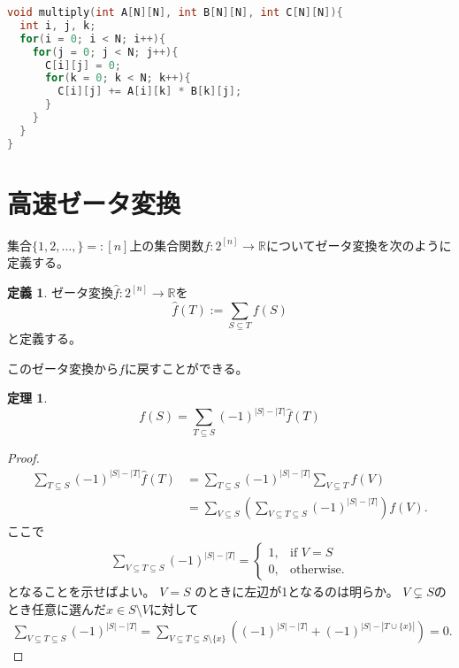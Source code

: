 \documentclass[a4paper,twoside,onecolumn,openany,article,10pt]{memoir}
\newtheorem{theorem}{定理}
\theoremstyle{definition}
\newtheorem{definition}{定義}
\theoremstyle{remark}
\begin{document}
\begin{lstlisting}[basicstyle=\ttfamily\normalsize,showstringspaces=false,language=C,frame=single]
void multiply(int A[N][N], int B[N][N], int C[N][N]){
  int i, j, k;
  for(i = 0; i < N; i++){
    for(j = 0; j < N; j++){
      C[i][j] = 0;
      for(k = 0; k < N; k++){
        C[i][j] += A[i][k] * B[k][j];
      }
    }
  }
}
\end{lstlisting}
\fi

\section{高速ゼータ変換}
集合$\{1,2,\dotsc,\}=:[n]$上の集合関数$f\colon 2^{[n]}\to\mathbb{R}$についてゼータ変換を次のように定義する。
\begin{definition}
ゼータ変換$\widehat{f}\colon 2^{[n]}\to\mathbb{R}$を
\begin{equation*}
\widehat{f}(T) := \sum_{S\subseteq T} f(S)
\end{equation*}
と定義する。
\end{definition}
このゼータ変換から$f$に戻すことができる。
\begin{theorem}\label{thm:mobius}
\begin{equation*}
f(S) = \sum_{T\subseteq S} (-1)^{|S|-|T|} \widehat{f}(T)
\end{equation*}
\end{theorem}
\begin{proof}
\begin{align*}
\sum_{T\subseteq S} (-1)^{|S|-|T|} \widehat{f}(T)
&=
\sum_{T\subseteq S} (-1)^{|S|-|T|} \sum_{V\subseteq T}f(V)\\
&=
\sum_{V\subseteq S} \left(\sum_{V\subseteq T\subseteq S} (-1)^{|S|-|T|}\right) f(V).
\end{align*}
ここで
\begin{align*}
\sum_{V\subseteq T\subseteq S} (-1)^{|S|-|T|} = 
\begin{cases}
1,&\text{if } V = S\\
0,&\text{otherwise}.
\end{cases}
\end{align*}
となることを示せばよい。
$V = S$ のときに左辺が1となるのは明らか。
$V \subsetneq S$のとき任意に選んだ$x\in S\setminus V$に対して
\begin{align*}
\sum_{V\subseteq T\subseteq S} (-1)^{|S|-|T|} = 
\sum_{V\subseteq T\subseteq S\setminus\{x\}} \left((-1)^{|S|-|T|}  + (-1)^{|S|-|T\cup\{x\}|}\right)
=0.
\end{align*}
\end{proof}
\end{document}
